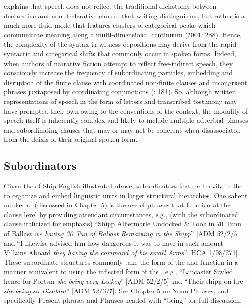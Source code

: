 \citeauthor{Givón2001} explains that speech does not reflect the traditional dichotomy between declarative and non-declarative clauses that writing distinguishes, but rather is a much more fluid mode that features clusters of categorical peaks which communicate meaning along a multi-dimensional continuum (2001: 288). Hence, the complexity of the syntax in witness depositions may derive from the rapid syntactic and categorical shifts that commonly occur in spoken forms. Indeed, when authors of narrative fiction attempt to reflect free-indirect speech, they consciously increase the frequency of subordinating particles, embedding and disruption of the finite clause with coordinated non-finite clauses and incongruent phrases juxtaposed by coordinating conjunctions (\citealt{Sotirova2016}: 181). So, although written representations of speech in the form of letters and transcribed testimony may have prompted their own  owing to the conventions of the context, the modality of speech itself is inherently complex and likely to include multiple adverbial phrases and subordinating clauses that may or may not be coherent when disassociated from the deixis of their original spoken form.   

\subsection{{Subordinators}}%

Given the  of Ship English illustrated above, subordinators feature heavily in the  to organize and embed linguistic units in larger structural hierarchies. One salient marker of  (discussed in Chapter 5) is the use of  phrases that function at the clause level by providing attendant circumstances, e.g., (with the subordinated clause italicized for emphasis) “Shipp Albermarle Undocked \& Took in 70 Tunn of Ballast \textit{we having 30 Tun of Ballast Remaining in the Shipp}” [ADM 52/2/5] and “I likewise advised him how dangerous it was to have in such amount Villains Aboard \textit{they having the command of his small Arms}” [HCA 1/98/271]. These subordinate structures commonly take the  form of the  and function in a manner equivalent to using the inflected form of the , e.g., “Lancaster Sayled hence for Portsm \textit{she being very Leakey}” [ADM 52/2/5] and “Their shipp on fire \textit{she being so Disabled}” [ADM 52/3/7]. See Chapter 5 on Noun Phrases, and specifically  Present  phrases and  Phrases headed with “being” for full discussion.

